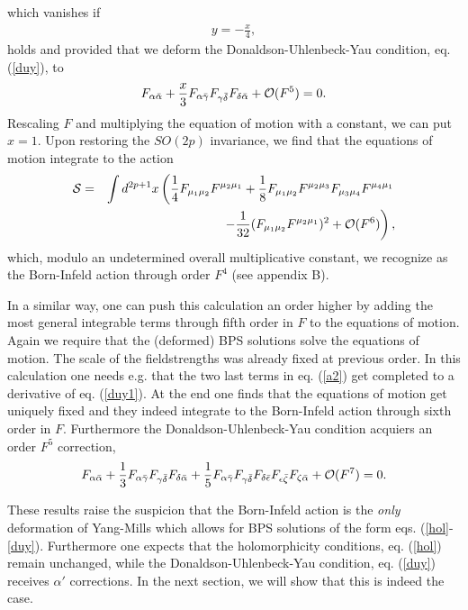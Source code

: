 \documentclass[a4paper,12pt,oneside]{article}
\begin{document}
which vanishes if
\begin{eqnarray}
y=-\frac x 4 ,
\end{eqnarray}
holds and provided that we deform the Donaldson-Uhlenbeck-Yau condition,
eq. (\ref{duy}), to
\begin{eqnarray}
F_{\alpha \bar\alpha}+\frac x 3 F_{\alpha 
\bar\gamma}F_{\gamma\bar\delta}F_{\delta\bar\alpha } +{\cal O}(F^5)=0.
\label{duy1}
\end{eqnarray}
Rescaling $F$ and multiplying the equation of motion with a constant,
we can put $x=1$. Upon restoring the $SO(2p)$ 
invariance, we find that the equations of motion integrate to the action
\begin{eqnarray}
{\cal S}&=&\int d^{2p+1}x\left(\frac 1 4 F_{\mu_1 \mu_2}F^{\mu_2 \mu_1}+ 
\frac 1 8 F_{\mu_1 \mu_2}F^{\mu_2\mu_3}F_{\mu _3\mu _4}F^{\mu _4\mu 
_1}\right.
\nonumber\\
&&\left. -
\frac{1}{32}(F_{\mu_1 \mu_2}F^{\mu_2 \mu_1})^2+{\cal O}( F^6) \right), 
\end{eqnarray}
which, modulo an undetermined overall multiplicative constant,
we recognize as the Born-Infeld action through order $F^4$ (see appendix B).

In a similar way, one can push this calculation an order higher by adding
the most general integrable terms through fifth order in $F$ to the
equations of motion. Again we require that the (deformed) BPS solutions
solve the equations of motion. The scale of the fieldstrengths was
already fixed at previous order. In this calculation one needs e.g. that
the two last terms in eq. (\ref{a2}) get completed to a derivative of eq.
(\ref{duy1}). At the end one finds that the equations of motion get
uniquely fixed and they indeed integrate to the Born-Infeld action
through sixth order in $F$. Furthermore the Donaldson-Uhlenbeck-Yau
condition acquiers an order $F^5$ correction,
\begin{eqnarray}
F_{\alpha \bar\alpha}+\frac 1 3 F_{\alpha 
\bar\gamma}F_{\gamma\bar\delta}F_{\delta\bar\alpha } +
\frac 1 5 F_{\alpha 
\bar\gamma}F_{\gamma\bar\delta}F_{\delta\bar\epsilon}
F_{\epsilon\bar\zeta}F_{\zeta\bar\alpha }
+{\cal O}(F^7)=0.
\end{eqnarray}

These results raise the suspicion that the Born-Infeld action is the {\em 
only} deformation of Yang-Mills which allows for BPS solutions of the form 
eqs. (\ref{hol}-\ref{duy}). Furthermore one expects that
the holomorphicity conditions, eq. (\ref{hol}) remain unchanged, 
while the Donaldson-Uhlenbeck-Yau condition, eq. (\ref{duy}) receives 
$\alpha '$ corrections. In the next section, we will show that this is 
indeed the case.
\end{document}

